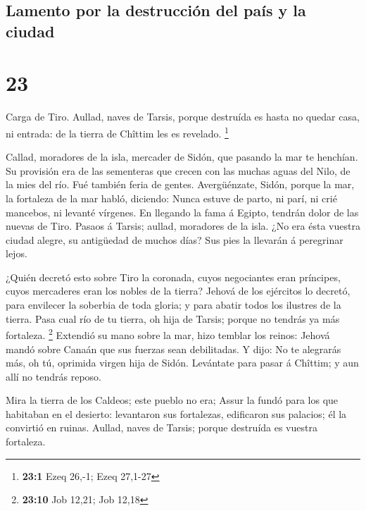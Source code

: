 \hypertarget{lamento-por-la-destrucciuxf3n-del-pauxeds-y-la-ciudad}{%
\subsection{Lamento por la destrucción del país y la
ciudad}\label{lamento-por-la-destrucciuxf3n-del-pauxeds-y-la-ciudad}}

\hypertarget{section-22}{%
\section{23}\label{section-22}}

 Carga de Tiro. Aullad, naves de Tarsis, porque destruída
es hasta no quedar casa, ni entrada: de la tierra de Chîttim les es
revelado. \footnote{\textbf{23:1} Ezeq 26,-1; Ezeq 27,1-27}

 Callad, moradores de la isla, mercader de Sidón, que
pasando la mar te henchían.  Su provisión era de las
sementeras que crecen con las muchas aguas del Nilo, de la mies del río.
Fué también feria de gentes.  Avergüénzate, Sidón, porque
la mar, la fortaleza de la mar habló, diciendo: Nunca estuve de parto,
ni parí, ni crié mancebos, ni levanté vírgenes.  En
llegando la fama á Egipto, tendrán dolor de las nuevas de Tiro.
 Pasaos á Tarsis; aullad, moradores de la isla.
 ¿No era ésta vuestra ciudad alegre, su antigüedad de
muchos días? Sus pies la llevarán á peregrinar lejos.

 ¿Quién decretó esto sobre Tiro la coronada, cuyos
negociantes eran príncipes, cuyos mercaderes eran los nobles de la
tierra?  Jehová de los ejércitos lo decretó, para
envilecer la soberbia de toda gloria; y para abatir todos los ilustres
de la tierra.  Pasa cual río de tu tierra, oh hija de
Tarsis; porque no tendrás ya más fortaleza. \footnote{\textbf{23:10} Job
  12,21; Job 12,18}  Extendió su mano sobre la mar, hizo
temblar los reinos: Jehová mandó sobre Canaán que sus fuerzas sean
debilitadas.  Y dijo: No te alegrarás más, oh tú,
oprimida virgen hija de Sidón. Levántate para pasar á Chîttim; y aun
allí no tendrás reposo.

 Mira la tierra de los Caldeos; este pueblo no era; Assur
la fundó para los que habitaban en el desierto: levantaron sus
fortalezas, edificaron sus palacios; él la convirtió en ruinas.
 Aullad, naves de Tarsis; porque destruída es vuestra
fortaleza.

